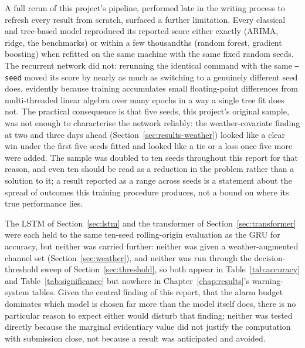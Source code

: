 \documentclass[12pt,a4paper]{report}
\begin{document}
A full rerun of this project's pipeline, performed late in the writing
process to refresh every result from scratch, surfaced a further limitation.
Every classical and tree-based model reproduced its reported score either
exactly (ARIMA, ridge, the benchmarks) or within a few thousandths (random
forest, gradient boosting) when refitted on the same machine with the same
fixed random seeds. The recurrent network did not: rerunning the identical
command with the same \texttt{--seed} moved its score by nearly as much as
switching to a genuinely different seed does, evidently because training
accumulates small floating-point differences from multi-threaded linear
algebra over many epochs in a way a single tree fit does not. The practical
consequence is that five seeds, this project's original sample, was not
enough to characterise the network reliably: the weather-covariate finding
at two and three days ahead (Section~\ref{sec:results-weather}) looked like a
clear win under the first five seeds fitted and looked like a tie or a loss
once five more were added. The sample was doubled to ten seeds throughout
this report for that reason, and even ten should be read as a reduction in
the problem rather than a solution to it; a result reported as a range
across seeds is a statement about the spread of outcomes this training
procedure produces, not a bound on where its true performance lies.

The LSTM of Section~\ref{sec:lstm} and the transformer of
Section~\ref{sec:transformer} were each held to the same ten-seed
rolling-origin evaluation as the GRU for accuracy, but neither was carried
further: neither was given a weather-augmented channel set
(Section~\ref{sec:weather}), and neither was run through the
decision-threshold sweep of Section~\ref{sec:threshold}, so both appear in
Table~\ref{tab:accuracy} and Table~\ref{tab:significance} but nowhere in
Chapter~\ref{chap:results}'s warning-system tables. Given the central
finding of this report, that the alarm budget dominates which model is
chosen far more than the model itself does, there is no particular reason
to expect either would disturb that finding; neither was tested directly
because the marginal evidentiary value did not justify the computation
with submission close, not because a result was anticipated and avoided.
\end{document}
